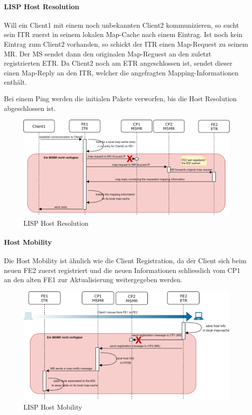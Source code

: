 \paragraph{LISP Host Resolution}
Will ein Client1 mit einem noch unbekannten Client2 kommunizieren, so sucht sein ITR zuerst in seinem lokalen Map-Cache nach einem Eintrag. Ist noch kein Eintrag zum Client2 vorhanden, so schickt der ITR einen Map-Request zu seinem MR. Der MS sendet dann den originalen Map-Reguest an den zuletzt registrierten ETR. Da Client2 noch am ETR angeschlossen ist, sendet dieser einen Map-Reply an den ITR, welcher die angefragten Mapping-Informationen enthält.

Bei einem Ping werden die initialen Pakete verworfen, bis die Host Resolution abgeschlossen ist. 

\begin{figure}[H]
	\centering
	\includegraphics[width=1\linewidth]{img/Absicherung/LISP-HostResolution-Fail}
	\caption{LISP Host Resolution}
	\label{fig:LISP Host Resolution}
\end{figure}

\paragraph{Host Mobility}
Die Host Mobility ist ähnlich wie die Client Registration, da der Client sich beim neuen FE2 zuerst registriert und die neuen Informationen schliesslich vom CP1 an den alten FE1 zur Aktualisierung weitergegeben werden.

\begin{figure}[H]
	\centering
	\includegraphics[width=1\linewidth]{img/Absicherung/LISP-HostMobility-Fail}
	\caption{LISP Host Mobility}
	\label{fig:LISP Host Mobility}
\end{figure}

